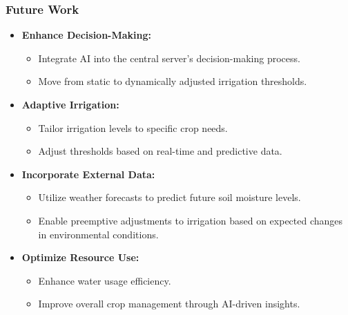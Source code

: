 \begin{frame}
    \frametitle{Future Work}
    \begin{itemize}
        \item \textbf{Enhance Decision-Making:}
        \begin{itemize}
            \item Integrate AI into the central server's decision-making process.
            \item Move from static to dynamically adjusted irrigation thresholds.
        \end{itemize}
        \item \textbf{Adaptive Irrigation:}
        \begin{itemize}
            \item Tailor irrigation levels to specific crop needs.
            \item Adjust thresholds based on real-time and predictive data.
        \end{itemize}
        \item \textbf{Incorporate External Data:}
        \begin{itemize}
            \item Utilize weather forecasts to predict future soil moisture levels.
            \item Enable preemptive adjustments to irrigation based on expected changes in environmental conditions.
        \end{itemize}
        \item \textbf{Optimize Resource Use:}
        \begin{itemize}
            \item Enhance water usage efficiency.
            \item Improve overall crop management through AI-driven insights.
        \end{itemize}
    \end{itemize}
\end{frame}

